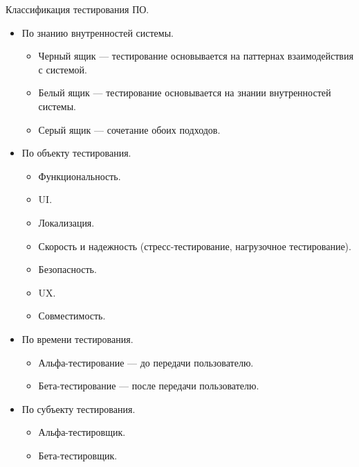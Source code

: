 
    \begin{Rem}
        Классификация тестирования ПО.
        \begin{itemize}
            \item По знанию внутренностей системы.
            \begin{itemize}
                \item Черный ящик --- тестирование основывается на паттернах взаимодействия с системой.
                \item Белый ящик --- тестирование основывается на знании внутренностей системы.
                \item Серый ящик --- сочетание обоих подходов.
            \end{itemize}

            \item По объекту тестирования.
            \begin{itemize}
                \item Функциональность.
                \item UI.
                \item Локализация.
                \item Скорость и надежность (стресс-тестирование, нагрузочное тестирование).
                \item Безопасность.
                \item UX.
                \item Совместимость.
            \end{itemize}

            \item По времени тестирования.
            \begin{itemize}
                \item Альфа-тестирование --- до передачи пользователю.
                \item Бета-тестирование --- после передачи пользователю.
            \end{itemize}

            \item По субъекту тестирования.
            \begin{itemize}
                \item Альфа-тестировщик.
                \item Бета-тестировщик.
            \end{itemize}


\end{itemize}
\end{Rem}
